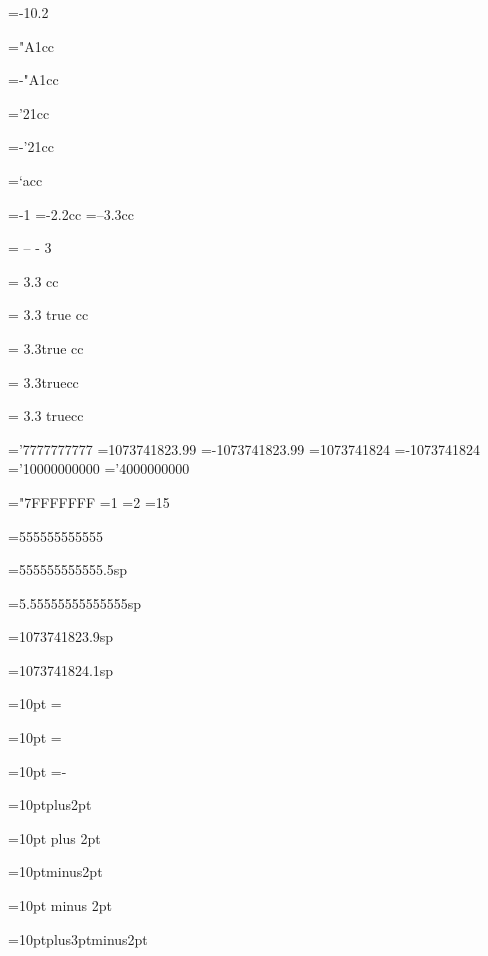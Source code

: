=-10.2
\showthe{}

="A1cc
\showthe{}

=-"A1cc
\showthe{}

='21cc
\showthe{}

=-'21cc
\showthe{}

=`acc
\showthe{}

=-1
\showthe{}
=-2.2cc
\showthe{}
=--3.3cc
\showthe{}

  =  -- - 3  
\showthe{}

 = 3.3  cc
\showthe{}

 = 3.3 true cc
\showthe{}

 = 3.3true cc
\showthe{}

 = 3.3truecc
\showthe{}

 = 3.3 truecc
\showthe{}

='7777777777
\showthe{}
=1073741823.99
\showthe{}
=-1073741823.99
\showthe{}
=1073741824
\showthe{}
=-1073741824
\showthe{}
='10000000000
\showthe{}
='4000000000
\showthe{}

="7FFFFFFF
=1
\showthe{}
=2
\showthe{}
=15
\showthe{}

=555555555555
\showthe{}

=555555555555.5sp
\showthe{}

=5.55555555555555sp
\showthe{}

=1073741823.9sp
\showthe{}

=1073741824.1sp
\showthe{}

=10pt
=\relax\relax
\showthe{}

=10pt
=\relax
\showthe{}

=10pt
=-\relax
\showthe{}

=10ptplus2pt
\showthe{}

=10pt plus 2pt
\showthe{}

=10ptminus2pt
\showthe{}

=10pt minus 2pt
\showthe{}

=10ptplus3ptminus2pt
\showthe{}

